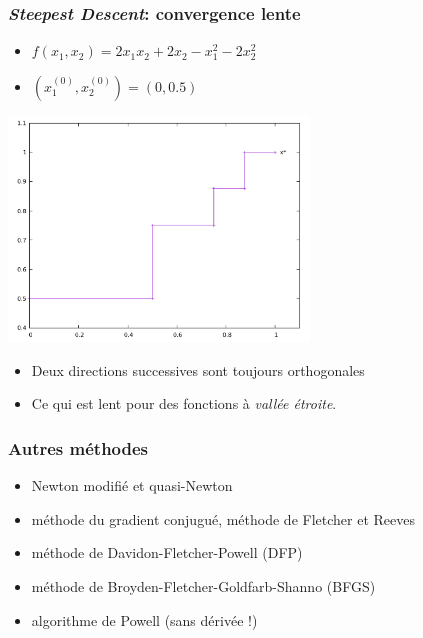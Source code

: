 \documentclass{beamer}
\begin{document}
\begin{frame}
  \frametitle{\emph{Steepest Descent}: convergence lente}

  \begin{itemize}
  \item $f(x_1,x_2) = 2x_1x_2 + 2x_2 - x_1^2 - 2x_2^2$
  \item$(x_1^{(0)}, x_2^{(0)}) = (0, 0.5)$ 
  \end{itemize}

  \begin{center}
      \includegraphics[width=0.6\textwidth]{steepest-desc}    
  \end{center}
  
  \begin{itemize}
  \item Deux directions successives sont toujours orthogonales
  \item Ce qui est lent pour des fonctions à \emph{vallée étroite}. 
  \end{itemize}
    
  
\end{frame}

\begin{frame}
  \frametitle{Autres méthodes}

  \begin{itemize}
  \item Newton modifié et quasi-Newton
  \item méthode du gradient conjugué, méthode de Fletcher et Reeves
  \item méthode de Davidon-Fletcher-Powell (DFP)
  \item méthode de Broyden-Fletcher-Goldfarb-Shanno (BFGS)
  \item algorithme de Powell (sans dérivée !)
  \end{itemize}
  
\end{frame}
\end{document}
